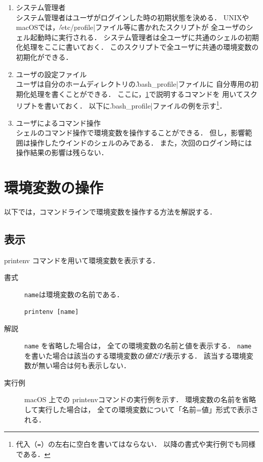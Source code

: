 \begin{enumerate}
\item システム管理者 \\
  システム管理者はユーザがログインした時の初期状態を決める．
  UNIXやmacOSでは，\|/etc/profile|ファイル等に書かれたスクリプトが
  全ユーザのシェル起動時に実行される．
  システム管理者は全ユーザに共通のシェルの初期化処理をここに書いておく．
  このスクリプトで全ユーザに共通の環境変数の初期化ができる．
\item ユーザの設定ファイル \\
  ユーザは自分のホームディレクトリの\|.bash_profile|ファイルに
  自分専用の初期化処理を書くことができる．
  ここに，\ref{environmentVariableOperation}で説明するコマンドを
  用いてスクリプトを書いておく．
  以下に\|.bash_profile|ファイルの例を示す\footnote{
    代入（\texttt{=}）の左右に空白を書いてはならない．
    以降の書式や実行例でも同様である．}．
  
\item ユーザによるコマンド操作 \\
  シェルのコマンド操作で環境変数を操作することができる．
  但し，影響範囲は操作したウインドのシェルのみである．
  また，次回のログイン時には操作結果の影響は残らない．
\end{enumerate}

\section{環境変数の操作}\label{environmentVariableOperation}
以下では，コマンドラインで環境変数を操作する方法を解説する．

\subsection{表示}
printenv コマンドを用いて環境変数を表示する．

\begin{description}
\item[書式] \texttt{name}は環境変数の名前である．
\begin{lstlisting}[numbers=none]
  printenv [name]
\end{lstlisting}
\item[解説]
  \texttt{name} を省略した場合は，
  全ての環境変数の名前と値を表示する．
  \texttt{name} を書いた場合は該当のする環境変数の\emph{値だけ}表示する．
  該当する環境変数が無い場合は何も表示しない．
\item [実行例]  macOS 上での printenvコマンドの実行例を示す．
  環境変数の名前を省略して実行した場合は，
  全ての環境変数について「名前=値」形式で表示される．
  
\end{description}

